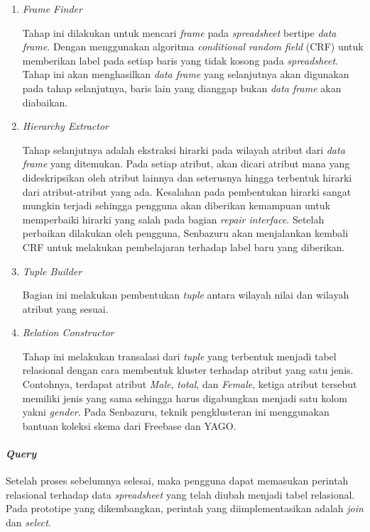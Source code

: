         \begin{enumerate}
            \item \textit{Frame Finder}

            Tahap ini dilakukan untuk mencari \textit{frame} pada \textit{spreadsheet} bertipe \textit{data frame}. Dengan menggunakan algoritma \textit{conditional random field} (CRF) untuk memberikan label pada setiap baris yang tidak kosong pada \textit{spreadsheet}. Tahap ini akan menghasilkan \textit{data frame} yang selanjutnya akan digunakan pada tahap selanjutnya, baris lain yang dianggap bukan \textit{data frame} akan diabaikan.

            \item \textit{Hierarchy Extractor}
            
            Tahap selanjutnya adalah ekstraksi hirarki pada wilayah atribut dari \textit{data frame} yang ditemukan. Pada setiap atribut, akan dicari atribut mana yang dideskripsikan oleh atribut lainnya dan seterusnya hingga terbentuk hirarki dari atribut-atribut yang ada. Kesalahan pada pembentukan hirarki sangat mungkin terjadi sehingga pengguna akan diberikan kemampuan untuk memperbaiki hirarki yang salah pada bagian \textit{repair interface}. Setelah perbaikan dilakukan oleh pengguna, Senbazuru akan menjalankan kembali CRF untuk melakukan pembelajaran terhadap label baru yang diberikan.

            \item \textit{Tuple Builder}
            
            Bagian ini melakukan pembentukan \textit{tuple} antara wilayah nilai dan wilayah atribut yang sesuai.

            \item \textit{Relation Constructor}

            Tahap ini melakukan transalasi dari \textit{tuple} yang terbentuk menjadi tabel relasional dengan cara membentuk kluster terhadap atribut yang satu jenis. Contohnya, terdapat atribut \textit{Male}, \textit{total}, dan \textit{Female}, ketiga atribut tersebut memiliki jenis yang sama sehingga harus digabungkan menjadi satu kolom yakni \textit{gender}. Pada Senbazuru, teknik pengklusteran ini menggunakan bantuan koleksi skema dari Freebase dan YAGO.
        \end{enumerate}

        \paragraph{\textit{Query}}
        Setelah proses sebelumnya selesai, maka pengguna dapat memasukan perintah relasional terhadap data \textit{spreadsheet} yang telah diubah menjadi tabel relasional. Pada prototipe yang dikembangkan, perintah yang diimplementasikan adalah \textit{join} dan \textit{select}.

